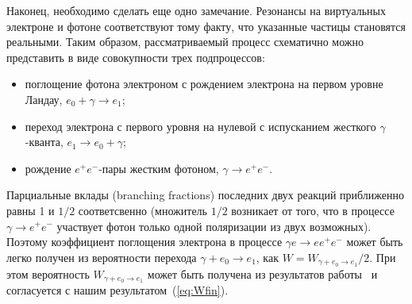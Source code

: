 Наконец, необходимо сделать еще одно замечание.  Резонансы 
на виртуальных электроне и 
фотоне соответствуют тому факту, что указанные частицы становятся 
реальными. Таким образом,  
рассматриваемый процесс схематично можно представить в виде совокупности трех 
подпроцессов: 
\begin{itemize}
\item
поглощение фотона электроном с рождением электрона на первом уровне Ландау, $e_0+\gamma \to e_1$; 

\item
переход электрона с первого уровня на нулевой с испусканием жесткого $\gamma$-кванта, 
$e_1 \to e_0 + \gamma$;

\item
рождение $e^+e^-$-пары жестким фотоном, $\gamma \to e^+e^-$.

\end{itemize}

Парциальные вклады (branching fractions) последних двух 
реакций приближенно равны 1 и $1/2$ соответсвенно 
(множитель $1/2$ возникает от того, 
что в процессе $\gamma \to e^+e^-$ участвует фотон только одной поляризации из двух возможных). 
Поэтому коэффициент поглощения электрона в  процессе  
$\gamma e \to e e^+e^-$ может быть легко получен из 
вероятности перехода $\gamma + e_0  \to e_1$, как $W = W_{\gamma + e_0 \to e_1}/2$. 
При этом вероятность $W_{\gamma + e_0 \to e_1}$ может быть получена из результатов 
работы~\cite{Latal:1986} и согласуется с нашим результатом~(\ref{eq:Wfin}).
 
 